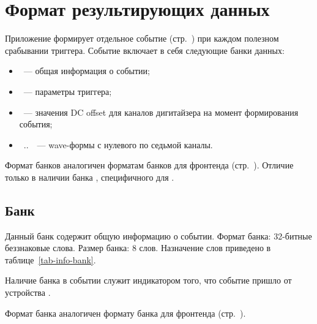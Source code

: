 \section{Формат результирующих данных}

Приложение \FE{} формирует отдельное событие (стр.~\pageref{sec-midas-event}) при каждом полезном срабывании триггера. Событие включает в себя следующие банки данных:

\begin{itemize}

\item {}~--- общая информация о событии;
\item {}~--- параметры триггера;
\item {}~--- значения DC offset для каналов дигитайзера на момент формирования события;
\item {}~..~~--- wave-формы с нулевого по седьмой каналы.

\end{itemize}

Формат банков аналогичен форматам банков для фронтенда  (стр.~\pageref{sec_v1720_event}). Отличие только в наличии банка , специфичного для \DEVICE{}.

\subsection{Банк }
\label{sec_v1724_bank_info}

Данный банк содержит общую информацию о событии. Формат банка: 32-битные беззнаковые слова. Размер банка: 8 слов. Назначение слов приведено в таблице~\ref{tab-info-bank}.

Наличие банка  в событии служит индикатором того, что событие пришло от устройства \DEVICE{}.

Формат банка аналогичен формату банка  для фронтенда  (стр.~\pageref{sec_bank_info}).